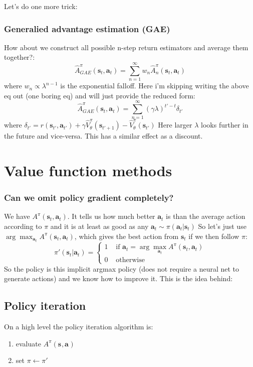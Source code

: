 \documentclass{report}
\newcommand{\argmax}{\arg\!\max}
\begin{document}
Let's do one more trick:
\subsubsection{Generalied advantage estimation (GAE)}
How about we construct all possible n-step return estimators and average them together?:
\begin{equation}
\hat{A}^\pi_{GAE} (\bm{s}_{t}, \bm{a}_{t}) =
\sum_{n=1}^{\infty} w_n \hat{A}^\pi_n (\bm{s}_{t}, \bm{a}_{t})
\end{equation}
where $w_n \propto \lambda^{n-1}$ is the exponential falloff.
Here i'm skipping writing the above eq out (one boring eq) and will just provide the reduced form:
\begin{equation}
\hat{A}^\pi_{GAE} (\bm{s}_{t}, \bm{a}_{t}) =
\sum_{n=1}^{\infty} (\gamma \lambda)^{t'-t}\delta_{t'}
\end{equation}
where $\delta_{t'} = r(\bm{s}_{t'}, \bm{a}_{t'}) + \gamma \hat{V}^\pi_\theta(\bm{s}_{t'+1})  - \hat{V}^\pi_\theta(\bm{s}_{t'})$
Here larger $\lambda$ looks further in the future and vice-versa.
This has a similar effect as a discount.

\section{Value function methods}
\subsubsection{Can we omit policy gradient completely?}
We have $A^\pi(\bm{s}_{t}, \bm{a}_{t})$.
It tells us how much better $\bm{a}_t$ is than the average action according to $\pi$ 
and it is at least as good as any $\bm{a}_t \sim \pi(\bm{a}_t|\bm{s}_t)$
So let's just use $ \argmax_{\bm{a}_t} A^\pi(\bm{s}_{t}, \bm{a}_{t}) $,
which gives the best action from $\bm{s}_t$ if we then follow $\pi$:
\begin{equation}
		\pi'(\bm{s}_{t}| \bm{a}_{t}) = \left\{ 
\begin{matrix}
		1 & \text{ if } \bm{a}_t = \argmax_{\bm{a}_t} A^\pi (\bm{s}_{t}, \bm{a}_{t}) 		 \\
		0 & \text{ otherwise}
\end{matrix}
		\right.
\end{equation}
So the policy is this implicit argmax policy (does not require a neural net to generate actions)
and we know how to improve it.
This is the idea behind:

\subsection{Policy iteration}
On a high level the policy iteration algorithm is:
\begin{enumerate}
		\item evaluate $A^\pi (\bm{s}_{}, \bm{a}_{}) $
		\item set $\pi \leftarrow \pi'$
\end{enumerate}
\end{document}
